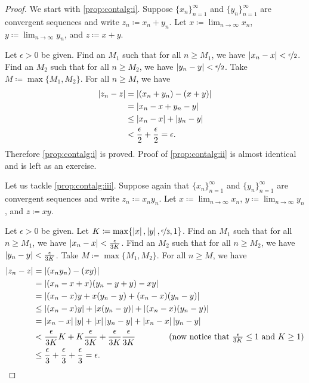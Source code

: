 \begin{proof}
We start with \ref{prop:contalg:i}.
Suppose $\{ x_n \}_{n=1}^\infty$ and $\{ y_n \}_{n=1}^\infty$ are convergent sequences and
write $z_n \coloneqq x_n + y_n$.  Let $x \coloneqq \lim_{n\to\infty} x_n$,
$y \coloneqq \lim_{n\to\infty} y_n$, and $z \coloneqq x+y$.

Let $\epsilon > 0$ be given.  
Find an $M_1$ such that for all $n \geq M_1$,
we have
$\left\lvert {x_n - x} \right\rvert < \nicefrac{\epsilon}{2}$.  
Find an $M_2$ such that for all $n \geq M_2$,
we have
$\left\lvert {y_n - y} \right\rvert < \nicefrac{\epsilon}{2}$.  Take $M \coloneqq \max \{ M_1, M_2 \}$.
For all $n \geq M$, we have
\begin{equation*}
\begin{split}
\left\lvert {z_n - z} \right\rvert &=
\left\lvert {(x_n+y_n) - (x+y)} \right\rvert \\
& =
\left\lvert {x_n-x + y_n-y} \right\rvert \\
& \leq
\left\lvert {x_n-x} \right\rvert + \left\lvert {y_n-y} \right\rvert \\
& <
\frac{\epsilon}{2} +
\frac{\epsilon}{2}
= \epsilon.
\end{split}
\end{equation*}
Therefore \ref{prop:contalg:i} is proved.
Proof of \ref{prop:contalg:ii} is almost identical and is left as an
exercise.

Let us tackle 
\ref{prop:contalg:iii}.
Suppose again that $\{ x_n \}_{n=1}^\infty$ and $\{ y_n \}_{n=1}^\infty$ are convergent sequences and
write $z_n \coloneqq x_n y_n$.  Let $x \coloneqq \lim_{n\to\infty} x_n$,
$y \coloneqq \lim_{n\to\infty} y_n$, and $z \coloneqq xy$.

Let $\epsilon > 0$ be given.
Let $K \coloneqq \max\{ \left\lvert {x} \right\rvert, \left\lvert {y} \right\rvert, \nicefrac{\epsilon}{3} , 1 \}$.
Find an $M_1$ such that for all $n \geq M_1$,
we have
$\left\lvert {x_n - x} \right\rvert < \frac{\epsilon}{3K}$.
Find an $M_2$ such that for all $n \geq M_2$,
we have
$\left\lvert {y_n - y} \right\rvert < \frac{\epsilon}{3K}$.  Take $M \coloneqq \max \{ M_1, M_2 \}$.
For all $n \geq M$, we have
\begin{equation*}
\begin{split}
\left\lvert {z_n - z} \right\rvert &=
\left\lvert {(x_ny_n) - (xy)} \right\rvert \\
& =
\left\lvert {(x_n-x+x)(y_n-y+y) - xy} \right\rvert \\
& =
\left\lvert {(x_n-x)y + x(y_n-y) +(x_n-x)(y_n-y)} \right\rvert \\
& \leq
\left\lvert {(x_n-x)y} \right\rvert + \left\lvert {x(y_n - y)} \right\rvert +
\left\lvert {(x_n-x)(y_n-y)} \right\rvert \\
& =
\left\lvert {x_n -x} \right\rvert\left\lvert {y} \right\rvert + 
\left\lvert {x} \right\rvert\left\lvert {y_n -y} \right\rvert + 
\left\lvert {x_n -x} \right\rvert\left\lvert {y_n -y} \right\rvert
\\
& <
\frac{\epsilon}{3K} K + 
K \frac{\epsilon}{3K} + 
\frac{\epsilon}{3K}
\frac{\epsilon}{3K}
\qquad \qquad \text{(now notice that } \tfrac{\epsilon}{3K} \leq 1
\text{ and }
K \geq 1\text{)}
\\
& \leq
\frac{\epsilon}{3} + \frac{\epsilon}{3} + \frac{\epsilon}{3}
 = \epsilon .
\end{split}
\end{equation*}


\end{proof}
